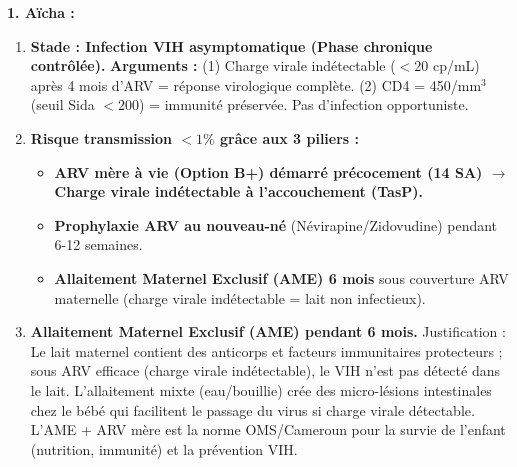 \documentclass[11pt]{article}
\begin{document}
\begin{corrige}
\textbf{1. Aïcha :}
\begin{enumerate}
    \item \textbf{Stade : Infection VIH asymptomatique (Phase chronique contrôlée).}
    \textbf{Arguments :} (1) Charge virale indétectable ($< 20$ cp/mL) après 4 mois d'ARV = réponse virologique complète. (2) CD4 = 450/mm$^3$ (seuil Sida $< 200$) = immunité préservée. Pas d'infection opportuniste.
    \item \textbf{Risque transmission $< 1\%$ grâce aux 3 piliers :}
    \begin{itemize}
        \item \textbf{ARV mère à vie (Option B+) démarré précocement (14 SA) $\rightarrow$ Charge virale indétectable à l'accouchement (TasP).}
        \item \textbf{Prophylaxie ARV au nouveau-né} (Névirapine/Zidovudine) pendant 6-12 semaines.
        \item \textbf{Allaitement Maternel Exclusif (AME) 6 mois} sous couverture ARV maternelle (charge virale indétectable = lait non infectieux).
    \end{itemize}
    \item \textbf{Allaitement Maternel Exclusif (AME) pendant 6 mois.} Justification : Le lait maternel contient des anticorps et facteurs immunitaires protecteurs ; sous ARV efficace (charge virale indétectable), le VIH n'est pas détecté dans le lait. L'allaitement mixte (eau/bouillie) crée des micro-lésions intestinales chez le bébé qui facilitent le passage du virus si charge virale détectable. L'AME + ARV mère est la norme OMS/Cameroun pour la survie de l'enfant (nutrition, immunité) et la prévention VIH.
\end{enumerate}


\end{corrige}
\end{document}
